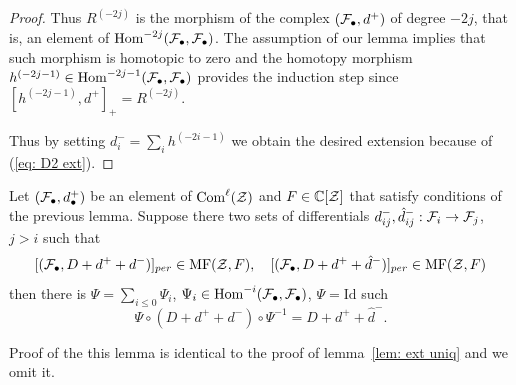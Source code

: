 \begin{proof}
Thus $R^{(-2j)}$ is the morphism of the complex $(\mathcal{F}_\bullet,d^+)$ of degree $-2j$, that is, an element of $\mathop{{\rm Hom}}\nolimits^{-2j}(\mathcal{F}_\bullet,\mathcal{F}_\bullet)$. The assumption of our lemma implies that such
morphism is homotopic to zero and the homotopy morphism $h^{(-2j-1)}\in \mathop{{\rm Hom}}\nolimits^{-2j-1}(\mathcal{F}_\bullet,\mathcal{F}_\bullet)$ provides the induction step
since $[h^{(-2j-1)},d^+]_+=R^{(-2j)}$.


Thus by setting $d_i^-=\sum_i h^{(-2i-1)}$ we obtain the desired extension because of (\ref{eq: D2 ext}).
\end{proof}


\begin{lemma}\label{lem: uniq MF+} Let $(\mathcal{F}_\bullet,d_\bullet^+)$ be an element of $\mathrm{Com}^\ell(\mathcal{Z})$ and $F\in \mathbb{C}[\mathcal{Z}]$ that satisfy conditions
of the previous lemma. Suppose there two sets of differentials  $d^-_{ij},\hat{d}^-_{ij}: \mathcal{F}_i\to \mathcal{F}_j$, $j>i$ such that
$$ [(\mathcal{F}_\bullet, D+d^++d^-)]_{per}\in \mathrm{MF}(\mathcal{Z},F),\quad [(\mathcal{F}_\bullet, D+d^++\hat{d}^-)]_{per}\in \mathrm{MF}(\mathcal{Z},F)$$
then there is $\Psi=\sum_{i\le 0}\Psi_i$, $\Psi_i\in \mathop{{\rm Hom}}\nolimits^{-i}(\mathcal{F}_\bullet,\mathcal{F}_\bullet)$, $\Psi=\mathrm{Id}$ such
$$ \Psi\circ (D+d^++d^-)\circ \Psi^{-1}= D+d^++\hat{d}^-.$$
\end{lemma}

Proof of the this lemma is identical to the proof of lemma~\ref{lem: ext uniq} and we omit it.



